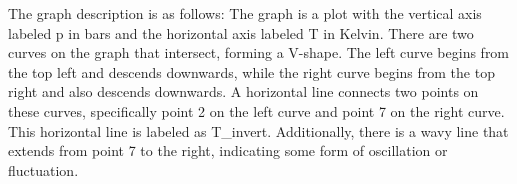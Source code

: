 The graph description is as follows: The graph is a plot with the vertical axis labeled p in bars and the horizontal axis labeled T in Kelvin. There are two curves on the graph that intersect, forming a V-shape. The left curve begins from the top left and descends downwards, while the right curve begins from the top right and also descends downwards. A horizontal line connects two points on these curves, specifically point 2 on the left curve and point 7 on the right curve. This horizontal line is labeled as T_invert. Additionally, there is a wavy line that extends from point 7 to the right, indicating some form of oscillation or fluctuation.